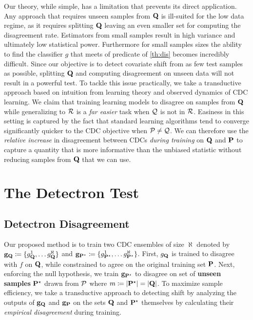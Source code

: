 Our theory, while simple, has a limitation that prevents its direct application.
Any approach that requires unseen samples from $\mathbf{Q}$ is ill-suited for the low data regime, as it requires splitting $\mathbf{Q}$ leaving an even smaller set
for computing the disagreement rate.
Estimators from small samples result in high variance and ultimately low statistical power.
Furthermore for small samples sizes the ability to find the classifier $g$ that meets of predicate of \autoref{th:dis} becomes incredibly difficult.
Since our objective is to detect covariate shift from as few test samples as possible, splitting $\mathbf{Q}$ and computing disagreement on unseen data will not result in a powerful test.
To tackle this issue practically, we take a transductive approach based on intuition from learning theory and observed dynamics of CDC learning.
We claim that training learning models to disagree on samples from $\mathbf{Q}$ while generalizing to $\mathcal{R}$ is a \textit{far easier} task when $\mathcal{Q}$ is not in $\mathcal{R}$.
Easiness in this setting is captured by the fact that standard learning algorithms tend to converge significantly quicker to the CDC objective when $\mathcal{P} \neq \mathcal{Q}$.
We can therefore use the \emph{relative increase} in disagreement between CDCs \textit{during training} on $\mathbf{Q}$ and $\mathbf{P}$ to capture a quantity that is more informative than the unbiased statistic without reducing samples from $\mathbf{Q}$ that we can use.


\section{The Detectron Test}\label{sec:the-detectron-test}

\subsection{Detectron Disagreement}
Our proposed method is to train two CDC ensembles of size $\aleph$
denoted by $\mathbf{g}_{\mathbf{Q}}\coloneqq \{g_{\mathbf{Q}}^1,\ldots {g}_{\mathbf{Q}}^\aleph\}$ and $\mathbf{g}_{\mathbf{P}^\star}\coloneqq \{g_{\mathbf{P}^\star}^1,\ldots g_{\mathbf{P}^\star}^\aleph\}$.
First, $g_{\mathbf{Q}}$ is trained to disagree with $f$ on $\mathbf{Q}$, while constrained to agree on the original training set $\mathbf{P}$.
Next, enforcing the null hypothesis, we train $\mathbf{g}_{\mathbf{P}^\star}$ to disagree on set of \textbf{unseen samples} $\mathbf{P}^\star$ drawn from $\mathcal{P}$ where $m\coloneqq|\mathbf{P}^\star|=|\mathbf{Q}|$.
To maximize sample efficiency, we take a transductive approach to detecting shift by analyzing the outputs of $\mathbf{g}_{\mathbf{Q}}$ and $\mathbf{g}_{\mathbf{P}}$ on the sets $\mathbf{Q}$ and $\mathbf{P}^\star$ themselves by
calculating their \textit{empirical disagreement} during training.

